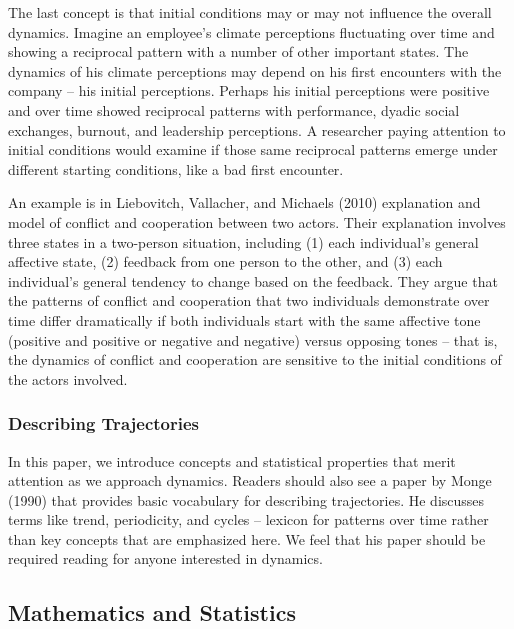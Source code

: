 \documentclass[english,,man]{apa6}
\theoremstyle{definition}
\theoremstyle{definition}
\theoremstyle{definition}
\theoremstyle{remark}
\begin{document}
The last concept is that initial conditions may or may not influence the
overall dynamics. Imagine an employee's climate perceptions fluctuating
over time and showing a reciprocal pattern with a number of other
important states. The dynamics of his climate perceptions may depend on
his first encounters with the company -- his initial perceptions.
Perhaps his initial perceptions were positive and over time showed
reciprocal patterns with performance, dyadic social exchanges, burnout,
and leadership perceptions. A researcher paying attention to initial
conditions would examine if those same reciprocal patterns emerge under
different starting conditions, like a bad first encounter.

An example is in Liebovitch, Vallacher, and Michaels (2010) explanation
and model of conflict and cooperation between two actors. Their
explanation involves three states in a two-person situation, including
(1) each individual's general affective state, (2) feedback from one
person to the other, and (3) each individual's general tendency to
change based on the feedback. They argue that the patterns of conflict
and cooperation that two individuals demonstrate over time differ
dramatically if both individuals start with the same affective tone
(positive and positive or negative and negative) versus opposing tones
-- that is, the dynamics of conflict and cooperation are sensitive to
the initial conditions of the actors involved.

\hypertarget{describing-trajectories}{%
\subsubsection{Describing Trajectories}\label{describing-trajectories}}

In this paper, we introduce concepts and statistical properties that
merit attention as we approach dynamics. Readers should also see a paper
by Monge (1990) that provides basic vocabulary for describing
trajectories. He discusses terms like trend, periodicity, and cycles --
lexicon for patterns over time rather than key concepts that are
emphasized here. We feel that his paper should be required reading for
anyone interested in dynamics.

\hypertarget{mathematics-and-statistics}{%
\subsection{Mathematics and
Statistics}\label{mathematics-and-statistics}}
\end{document}
